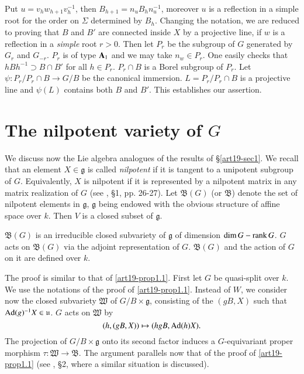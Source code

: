 Put $u=v_{h}w_{h+1}v^{-1}_{h}$, then $B_{h+1}=n_{u}B_{h}n^{-1}_{u}$, moreover $u$ is a reflection in a simple root for the order on $\Sigma$ determined by $B_{h}$. Changing the notation, we are reduced to proving that $B$ and $B'$ are connected inside $X$ by a projective line, if $w$ is a reflection in a {\em simple} root $r>0$. Then let $P_{r}$ be the subgroup of $G$ generated by $G_{r}$ and $G_{-r}$. $P_{r}$ is of type $\mathbf{A}_{1}$ and we may take $n_{w}\in P_{r}$. One easily checks that $hBh^{-1}\supset B\cap B'$ for all $h\in P_{r}$. $P_{r}\cap B$ is a Borel subgroup of $P_{r}$. Let $\psi:P_{r}/P_{r}\cap B\to G/B$ be the canonical immersion. $L=P_{r}/P_{r}\cap B$ is a projective line and $\psi(L)$ contains both $B$ and $B'$. This establishes our assertion.

\section{The nilpotent variety of \texorpdfstring{$G$}{G}}\label{art19-sec2}

We discuss now the Lie algebra analogues of the results of \S\ref{art19-sec1}. We recall that an element $X\in \mathfrak{g}$ is called {\em nilpotent} if it is tangent to a unipotent subgroup of $G$. Equivalently, $X$ is nilpotent if it is represented by a nilpotent matrix in any matrix realization of $G$ (see \cite{art19-key1}, \S1, pp. 26-27). Let $\mathfrak{B}(G)$ (or $\mathfrak{B}$) denote the set of nilpotent elements in $\mathfrak{g}$, $\mathfrak{g}$ being endowed with the obvious structure of affine space over $k$. Then $V$ is a closed subset of $\mathfrak{g}$.

\begin{proposition}\label{art19-prop2.1}
$\mathfrak{B}(G)$ is an irreducible closed subvariety of $\mathfrak{g}$ of dimension $\dim G -\operatorname{\mathrm{rank}} G$. $G$ acts on $\mathfrak{B}(G)$ via the adjoint representation of $G$. $\mathfrak{B}(G)$ and the action of $G$ on it are defined over $k$.
\end{proposition}

The proof is similar to that of \ref{art19-prop1.1}. First let $G$ be quasi-split over $k$. We use the notations of the proof of \ref{art19-prop1.1}. Instead of $W$, we consider now the closed subvariety $\mathfrak{W}$ of $G/B\times \mathfrak{g}$, consisting of the $(gB,X)$ such that $\operatorname{\mathrm{Ad}}(g)^{-1}X\in \mathfrak{u}$. $G$ acts on $\mathfrak{W}$ by
$$
(h,(gB,X))\mapsto (hgB,\operatorname{\mathrm{Ad}}(h)X).
$$
The projection of $G/B\times \mathfrak{g}$ onto its second factor induces a $G$-equivariant proper morphism $\tau : \mathfrak{W}\to \mathfrak{B}$. The argument parallels now that of the proof of \ref{art19-prop1.1} (see \cite{art19-key2}, \S2, where a similar situation is discussed).

